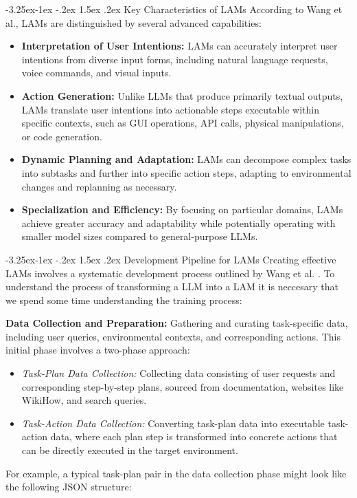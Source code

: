 \documentclass[journal,twoside,10pt]{IEEEtran}
\makeatletter
\renewcommand\subsection{\@startsection{subsection}{2}{\z@}%
                       {-3.25ex\@plus -1ex \@minus -.2ex}%
                       {1.5ex \@plus .2ex}%
                       {\normalfont\large\bfseries}}
\makeatother
\begin{document}
\subsection{Key Characteristics of LAMs}
According to Wang et al., LAMs are distinguished by several advanced capabilities:

\begin{itemize}
    \item \textbf{Interpretation of User Intentions:} LAMs can accurately interpret user intentions from diverse input forms, including natural language requests, voice commands, and visual inputs.
    \item \textbf{Action Generation:} Unlike LLMs that produce primarily textual outputs, LAMs translate user intentions into actionable steps executable within specific contexts, such as GUI operations, API calls, physical manipulations, or code generation.
    \item \textbf{Dynamic Planning and Adaptation:} LAMs can decompose complex tasks into subtasks and further into specific action steps, adapting to environmental changes and replanning as necessary.
    \item \textbf{Specialization and Efficiency:} By focusing on particular domains, LAMs achieve greater accuracy and adaptability while potentially operating with smaller model sizes compared to general-purpose LLMs.
\end{itemize}

\subsection{Development Pipeline for LAMs}
Creating effective LAMs involves a systematic development process outlined by Wang et al. \cite{wang2023lam}. To understand the process of transforming a LLM into a LAM it is neccesary that we spend some time understanding the training process:

\textbf{Data Collection and Preparation:} Gathering and curating task-specific data, including user queries, environmental contexts, and corresponding actions. This initial phase involves a two-phase approach:
\begin{itemize}
    \item \textit{Task-Plan Data Collection:} Collecting data consisting of user requests and corresponding step-by-step plans, sourced from documentation, websites like WikiHow, and search queries.
    \item \textit{Task-Action Data Collection:} Converting task-plan data into executable task-action data, where each plan step is transformed into concrete actions that can be directly executed in the target environment.
\end{itemize}
For example, a typical task-plan pair in the data collection phase might look like the following JSON structure:
\end{document}
